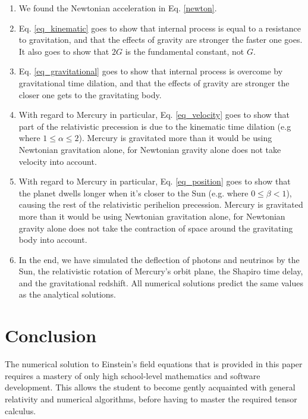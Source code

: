 \documentclass[12pt]{article}
\begin{document}
\begin{enumerate}
\item
We found the Newtonian acceleration in Eq. \ref{newton}.

\item
Eq. \ref{eq_kinematic} goes to show that internal process is equal to a resistance to gravitation, and that the effects of gravity are stronger the faster one goes.
It also goes to show that $2G$ is the fundamental constant, not $G$.

\item
Eq. \ref{eq_gravitational} goes to show that internal process is overcome by gravitational time dilation, and that the effects of gravity are stronger the closer one gets to the gravitating body.

\item
With regard to Mercury in particular, Eq. \ref{eq_velocity} goes to show that part of the relativistic precession is due to the kinematic time dilation (e.g where $1 \leq \alpha \leq 2$). 
Mercury is gravitated more than it would be using Newtonian gravitation alone, for Newtonian gravity alone does not take velocity into account.

\item
With regard to Mercury in particular, Eq. \ref{eq_position} goes to show that the planet dwells longer when it's closer to the Sun (e.g. where $0 \leq \beta < 1$), causing the rest of the relativistic perihelion precession. 
Mercury is gravitated more than it would be using Newtonian gravitation alone, for Newtonian gravity alone does not take the contraction of space around the gravitating body into account.

\item
In the end, we have simulated the deflection of photons and neutrinos by the Sun, the relativistic rotation of Mercury's orbit plane, the Shapiro time delay, and the gravitational redshift.
All numerical solutions predict the same values as the analytical solutions.

\end{enumerate}






\section{Conclusion}

The numerical solution to Einstein's field equations that is provided in this paper requires a mastery of only high school-level mathematics and software development.
This allows the student to become gently acquainted with general relativity and numerical algorithms, before having to master the required tensor calculus.
\end{document}
